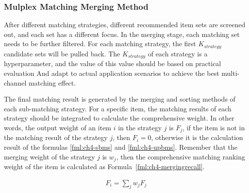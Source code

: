 \subsubsection{Mulplex Matching Merging Method}


After different matching strategies, different recommended item sets are screened out, and each set has a different focus. In the merging stage, each matching set needs to be further filtered. For each matching strategy, the first \(K_{strategy}\) candidate sets will be pulled back. The \(K_{strategy}\) of each strategy is a hyperparameter, and the value of this value should be based on practical evaluation And adapt to actual application scenarios to achieve the best multi-channel matching effect.

The final matching result is generated by the merging and sorting methods of each sub-matching strategy. For a specific item, the matching results of each strategy should be integrated to calculate the comprehensive weight. In other words, the output weight of an item \(i\) in the strategy \(j\) is \(F_j\), if the item is not in the matching result of the strategy \(j\), then \(F_i =0\), otherwise it is the calculation result of the formulas \ref{fml:ch4-sbms} and \ref{fml:ch4-upbms}. Remember that the merging weight of the strategy \(j\) is \(w_j\), then the comprehensive matching ranking weight of the item is calculated as Formula~\ref{fml:ch4-mergingrecall}.

\begin{align}
  F_i = \sum_{j}{w_j F_j}\label{fml:ch4-mergingrecall}
\end{align}



